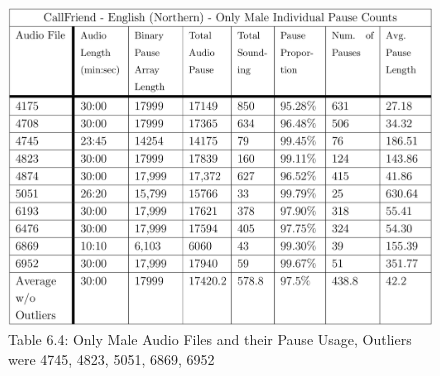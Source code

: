 \begin{figure}[ht]
	\begin{center}
		\includegraphics[scale=0.45]{src/main-matter/results/experiment-sex/pause-analysis/male-pause-table}
		\caption{Table 6.4: Only Male Audio Files and their Pause Usage, Outliers were 4745, 4823, 5051, 6869, 6952}
		\label{female-10bins}
	\end{center}
\end{figure}







